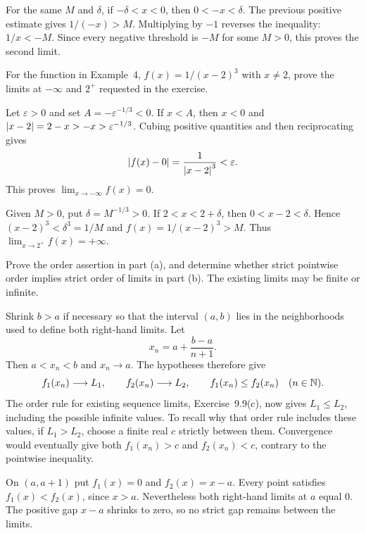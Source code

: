 For the same $M$ and $\delta$, if $-\delta<x<0$, then
$0<-x<\delta$. The previous positive estimate gives
$1/(-x)>M$. Multiplying by $-1$ reverses the inequality:
$1/x<-M$. Since every negative threshold is $-M$ for some
$M>0$, this proves the second limit.

\goal For the function in Example~4,
$f(x)=1/(x-2)^3$ with $x\ne2$, prove the limits at $-\infty$
and $2^+$ requested in the exercise.

Let $\varepsilon>0$ and set $A=-\varepsilon^{-1/3}<0$.
If $x<A$, then $x<0$ and
$\left|x-2\right|=2-x>-x>\varepsilon^{-1/3}$.
Cubing positive quantities and then reciprocating gives
\[
 \left|f(x)-0\right|=\frac1{\left|x-2\right|^3}<\varepsilon.
\]
This proves $\lim_{x\to-\infty}f(x)=0$.

Given $M>0$, put $\delta=M^{-1/3}>0$.
If $2<x<2+\delta$, then $0<x-2<\delta$. Hence
$(x-2)^3<\delta^3=1/M$ and
$f(x)=1/(x-2)^3>M$.
Thus $\lim_{x\to2^+}f(x)=+\infty$.

\goal Prove the order assertion in part (a), and determine whether
strict pointwise order implies strict order of limits in part (b).
The existing limits may be finite or infinite.

Shrink $b>a$ if necessary so that the interval $(a,b)$ lies
in the neighborhoods used to define both right-hand limits.
Let
\[
 x_n=a+\frac{b-a}{n+1}.
\]
Then $a<x_n<b$ and $x_n\to a$. The hypotheses therefore give
\[
 f_1(x_n)\longrightarrow L_1,\qquad
 f_2(x_n)\longrightarrow L_2,\qquad
 f_1(x_n)\le f_2(x_n)\quad(n\in\mathbb{N}).
\]
The order rule for existing sequence limits, Exercise~9.9(c),
now gives $L_1\le L_2$, including the possible infinite values.
To recall why that order rule includes these values, if
$L_1>L_2$, choose a finite real $c$ strictly between them.
Convergence would eventually give both $f_1(x_n)>c$ and
$f_2(x_n)<c$, contrary to the pointwise inequality.

On $(a,a+1)$ put $f_1(x)=0$ and $f_2(x)=x-a$.
Every point satisfies $f_1(x)<f_2(x)$, since $x>a$.
Nevertheless both right-hand limits at $a$ equal $0$.
The positive gap $x-a$ shrinks to zero, so no strict gap remains
between the limits.


